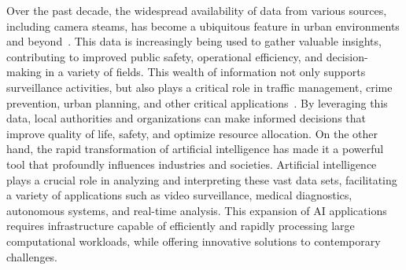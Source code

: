 

Over the past decade, the widespread availability of data from various sources, including camera steams, has become a ubiquitous feature in urban environments and beyond~\cite{}. This data is increasingly being used to gather valuable insights, contributing to improved public safety, operational efficiency, and decision-making in a variety of fields. This wealth of information not only supports surveillance activities, but also plays a critical role in traffic management, crime prevention, urban planning, and other critical applications~\cite{}. By leveraging this data, local authorities and organizations can make informed decisions that improve quality of life, safety, and optimize resource allocation.
On the other hand, the rapid transformation of artificial intelligence has made it a powerful tool that profoundly influences industries and societies. Artificial intelligence plays a crucial role in analyzing and interpreting these vast data sets, facilitating a variety of applications such as video surveillance, medical diagnostics, autonomous systems, and real-time analysis. This expansion of AI applications requires infrastructure capable of efficiently and rapidly processing large computational workloads, while offering innovative solutions to contemporary challenges.


